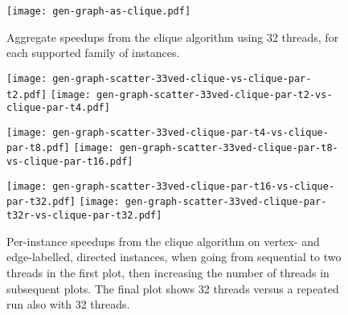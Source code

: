 \documentclass[sigconf]{acmart}
\begin{document}
\begin{figure}[tb]
    \texttt{[image: gen-graph-as-clique.pdf]}

    \caption{Aggregate speedups from the clique algorithm using 32 threads, for each supported
    family of instances.}
\end{figure}

% 
% 
% 
% 
\begin{figure}[tb]
    \texttt{[image: gen-graph-scatter-33ved-clique-vs-clique-par-t2.pdf]}
    \hfill
    \texttt{[image: gen-graph-scatter-33ved-clique-par-t2-vs-clique-par-t4.pdf]}

    \vspace*{1em}

    \texttt{[image: gen-graph-scatter-33ved-clique-par-t4-vs-clique-par-t8.pdf]}
    \hfill
    \texttt{[image: gen-graph-scatter-33ved-clique-par-t8-vs-clique-par-t16.pdf]}

    \vspace*{1em}

    \texttt{[image: gen-graph-scatter-33ved-clique-par-t16-vs-clique-par-t32.pdf]}
    \hfill
    \texttt{[image: gen-graph-scatter-33ved-clique-par-t32r-vs-clique-par-t32.pdf]}

    \caption{Per-instance speedups from the clique algorithm on vertex- and edge-labelled, directed
    instances, when going from sequential to two threads in the first plot, then increasing the
    number of threads in subsequent plots. The final plot shows 32 threads versus a repeated run
    also with 32 threads.}
\end{figure}
\end{document}
